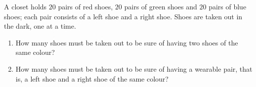 A closet holds $20$ pairs of red shoes, $20$ pairs of green shoes and $20$ pairs of blue shoes; each pair consists of a left shoe and a right shoe. Shoes are taken out in the dark, one at a time.
\begin{enumerate}
\item[(a)] How many shoes must be taken out to be sure of having two shoes of the same colour?
\item[(b)] How many shoes must be taken out to be sure of having a wearable pair, that is, a left shoe and a right shoe of the same colour?
\end{enumerate}
